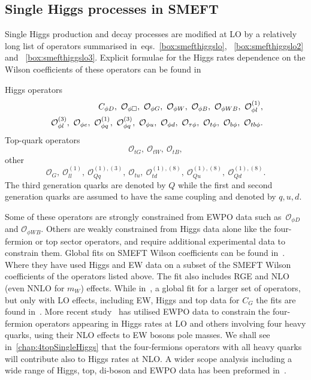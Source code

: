 \subsection{Single Higgs processes in SMEFT}
Single Higgs production and decay processes are modified at LO by a relatively long list of operators summarised in~eqs.~\eqref{box:smefthiggslo}, ~\eqref{box:smefthiggslo2} and ~\eqref{box:smefthiggslo3}. Explicit formulae for the Higgs rates dependence on the Wilson coefficients of these operators can be found in~\cite{ATLAS:2019dhi}
\begin{tcolorbox}[title=SMEFT operators modifying Higgs rates at LO,
	title filled=false,
	colback=Mahogany!5!white,
	colframe=Mahogany ]
Higgs operators
	\begin{align}
C_{\phi D}, \ \mathcal{O}_{\phi \Box},\ \mathcal{O}_{\phi G}, \ \mathcal{O}_{\phi W},\ \mathcal{O}_{\phi B}, \ \mathcal{O}_{\phi W B},\ \mathcal{O}_{\phi l}^{(1)}, \nn \\
 \ \mathcal{O}_{\phi l}^{(3)}, \ \mathcal{O}_{\phi e},\ \mathcal{O}_{\phi q}^{(1)},\ \mathcal{O}_{\phi q}^{(3)}, \  \mathcal{O}_{\phi u}, \ \mathcal{O}_{\phi d},\ \mathcal{O}_{\tau \phi}, \ \mathcal{O}_{t \phi}, \ \mathcal{O}_{b \phi},\ \mathcal{O}_{tb \phi}.
 	\label{box:smefthiggslo}
	\end{align}
Top-quark operators
	\begin{equation}
 \mathcal{O}_{t G}, \ \mathcal{O}_{t W}, \ \mathcal{O}_{t B},
 	\label{box:smefthiggslo2}
\end{equation}
other 
	\begin{equation}
	\mathcal{O}_G,\ \mathcal{O}_{ll}^{(1)},\ \mathcal{O}_{Qq}^{(1),(3)},\ \mathcal{O}_{tu},\ \mathcal{O}_{td}^{(1),(8)},\ \mathcal{O}_{Qu}^{(1),(8)}, \ \mathcal{O}_{Qd}^{(1),(8)}.
		\label{box:smefthiggslo3}
\end{equation}
The third generation quarks are denoted by $Q$ while the first and second generation quarks are assumed to have the same coupling and denoted by $q,u,d$.
\end{tcolorbox}
Some of these operators are strongly constrained from EWPO data such as~$\mathcal{O}_{\phi D}$ and $ \mathcal{O}_{\phi W B}$. Others are weakly constrained from Higgs data alone like the four-fermion  or top sector operators, and require additional experimental data to constrain them. Global fits on SMEFT Wilson coefficients can be found in~\cite{Dawson:2020oco}. Where they have used Higgs and EW data on a subset of the SMEFT Wilson coefficients of the operators listed above. The fit also includes RGE and NLO (even NNLO for $m_W$) effects. While in~\cite{Ethier:2021bye}, a global fit for a larger set of operators, but only with LO effects, including EW, Higgs and top data for $C_G$ the fits are found in~\cite{Ellis:2018gqa}.  More recent study~\cite{Dawson:2022bxd} has utilised EWPO data to constrain the four-fermion operators appearing in Higgs rates at LO and others involving four heavy quarks, using their NLO effects to EW bosons pole masses. We shall see in~\autoref{chap:4topSingleHiggs} that the four-fermions operators with all heavy quarks will contribute also to Higgs rates at NLO. A wider scope analysis including a wide range of Higgs, top, di-boson and EWPO data has been preformed in~\cite{Ellis:2020unq}. \\
